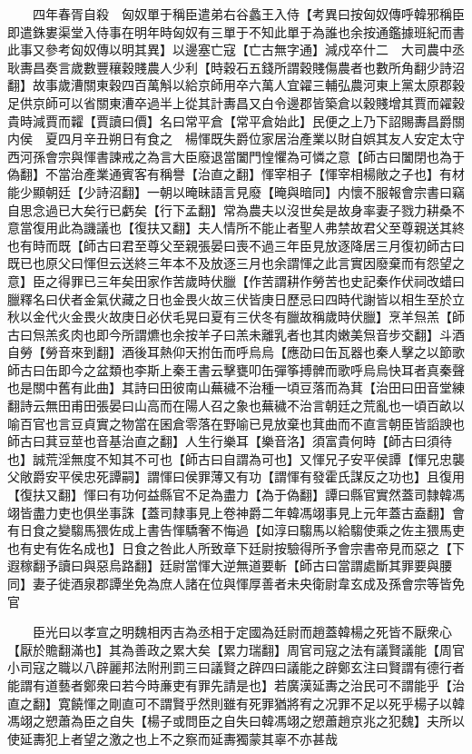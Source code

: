 　　四年春胥自殺　匈奴單于稱臣遣弟右谷蠡王入侍【考異曰按匈奴傳呼韓邪稱臣即遣銖婁渠堂入侍事在明年時匈奴有三單于不知此單于為誰也余按通鑑據班紀而書此事又參考匈奴傳以明其異】以邊塞亡寇【亡古無字通】減戍卒什二　大司農中丞耿夀昌奏言歲數豐穰穀賤農人少利【時穀石五錢所謂穀賤傷農者也數所角翻少詩沼翻】故事歲漕關東穀四百萬斛以給京師用卒六萬人宜糴三輔弘農河東上黨太原郡穀足供京師可以省關東漕卒過半上從其計夀昌又白令邊郡皆築倉以穀賤增其賈而糴穀貴時減賈而糶【賈讀曰價】名曰常平倉【常平倉始此】民便之上乃下詔賜夀昌爵關内侯　夏四月辛丑朔日有食之　楊惲既失爵位家居治產業以財自娯其友人安定太守西河孫會宗與惲書諫戒之為言大臣廢退當闔門惶懼為可憐之意【師古曰闔閉也為于偽翻】不當治產業通賓客有稱譽【治直之翻】惲宰相子【惲宰相楊敞之子也】有材能少顯朝廷【少詩沼翻】一朝以晻昧語言見廢【晻與暗同】内懷不服報會宗書曰竊自思念過已大矣行已虧矣【行下孟翻】常為農夫以沒世矣是故身率妻子戮力耕桑不意當復用此為譏議也【復扶又翻】夫人情所不能止者聖人弗禁故君父至尊親送其終也有時而既【師古曰君至尊父至親張晏曰喪不過三年臣見放逐降居三月復初師古曰既已也原父曰惲但云送終三年本不及放逐三月也余謂惲之此言實因廢棄而有怨望之意】臣之得罪已三年矣田家作苦歲時伏臘【作苦謂耕作勞苦也史記秦作伏祠改蜡曰臘釋名曰伏者金氣伏藏之日也金畏火故三伏皆庚日歷忌曰四時代謝皆以相生至於立秋以金代火金畏火故庚日必伏毛晃曰夏有三伏冬有臘故稱歲時伏臘】烹羊炰羔【師古曰炰羔炙肉也即今所謂爊也余按羊子曰羔未離乳者也其肉嫩美炰音步交翻】斗酒自勞【勞音來到翻】酒後耳熱仰天拊缶而呼烏烏【應劭曰缶瓦器也秦人擊之以節歌師古曰缶即今之盆類也李斯上秦王書云擊甕叩缶彈筝搏髀而歌呼烏烏快耳者真秦聲也是關中舊有此曲】其詩曰田彼南山蕪穢不治種一頃豆落而為萁【治田曰田音堂練翻詩云無田甫田張晏曰山高而在陽人召之象也蕪穢不治言朝廷之荒亂也一頃百畝以喻百官也言豆貞實之物當在囷倉零落在野喻已見放棄也萁曲而不直言朝臣皆謟諛也師古曰萁豆莖也音基治直之翻】人生行樂耳【樂音洛】須富貴何時【師古曰須待也】誠荒淫無度不知其不可也【師古曰自謂為可也】又惲兄子安平侯譚【惲兄忠襲父敞爵安平侯忠死譚嗣】謂惲曰侯罪薄又有功【謂惲有發霍氏謀反之功也】且復用【復扶又翻】惲曰有功何益縣官不足為盡力【為于偽翻】譚曰縣官實然蓋司隸韓馮翊皆盡力吏也俱坐事誅【蓋司隸事見上卷神爵二年韓馮翊事見上元年蓋古盍翻】會有日食之變騶馬猥佐成上書告惲驕奢不悔過【如淳曰騶馬以給騶使乘之佐主猥馬吏也有史有佐名成也】日食之咎此人所致章下廷尉按驗得所予會宗書帝見而惡之【下遐稼翻予讀曰與惡烏路翻】廷尉當惲大逆無道要斬【師古曰當謂處斷其罪要與腰同】妻子徙酒泉郡譚坐免為庶人諸在位與惲厚善者未央衛尉韋玄成及孫會宗等皆免官

　　臣光曰以孝宣之明魏相丙吉為丞相于定國為廷尉而趙蓋韓楊之死皆不厭衆心【厭於贍翻滿也】其為善政之累大矣【累力瑞翻】周官司寇之法有議賢議能【周官小司寇之職以八辟麗邦法附刑罰三曰議賢之辟四曰議能之辟鄭玄注曰賢謂有德行者能謂有道藝者鄭衆曰若今時亷吏有罪先請是也】若廣漢延夀之治民可不謂能乎【治直之翻】寛饒惲之剛直可不謂賢乎然則雖有死罪猶將宥之况罪不足以死乎楊子以韓馮翊之愬蕭為臣之自失【楊子或問臣之自失曰韓馮翊之愬蕭趙京兆之犯魏】夫所以使延夀犯上者望之激之也上不之察而延夀獨蒙其辜不亦甚哉

